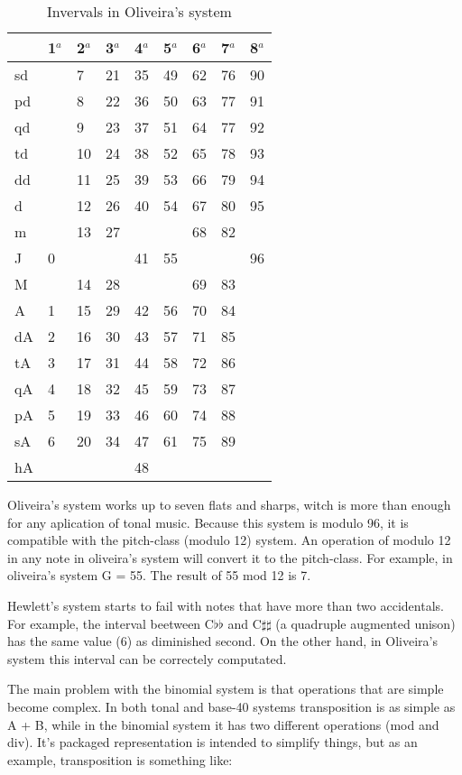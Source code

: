 \documentclass{article}
\begin{document}
\begin{table}
  \centering
  \begin{tabular}{l|llllllll}
    & 1$^{a}$& 2$^{a}$& 3$^{a}$& 4$^{a}$& 5$^{a}$& 6$^{a}$& 7$^{a}$& 8$^{a}$ \\
    \hline
    sd  &  & 7&21&35&49&62&76&90 \\
    pd  &  & 8&22&36&50&63&77&91 \\
    qd  &  & 9&23&37&51&64&77&92 \\
    td  &  &10&24&38&52&65&78&93 \\
    dd  &  &11&25&39&53&66&79&94 \\
    d   &  &12&26&40&54&67&80&95 \\
    m   &  &13&27&  &  &68&82&   \\
    J   & 0&  &  &41&55&  &  &96 \\
    M   &  &14&28&  &  &69&83&   \\
    A   & 1&15&29&42&56&70&84&   \\
    dA  & 2&16&30&43&57&71&85&   \\
    tA  & 3&17&31&44&58&72&86&   \\
    qA  & 4&18&32&45&59&73&87&   \\
    pA  & 5&19&33&46&60&74&88&   \\
    sA  & 6&20&34&47&61&75&89&   \\
    hA  &  &  &  &48&  &  &  &   
  \end{tabular}
  \caption{Invervals in Oliveira's system}
  \label{tab:jama-intervalos}
\end{table}

Oliveira's system works up to seven flats and sharps, witch is more
than enough for any aplication of tonal music. Because this system is
modulo 96, it is compatible with the pitch-class (modulo 12) system.
An operation of modulo 12 in any note in oliveira's system will
convert it to the pitch-class. For example, in oliveira's system G =
55. The result of 55 mod 12 is 7.

Hewlett's system starts to fail with notes that have more than two
accidentals. For example, the interval beetween C$\flat\flat$ and
C$\sharp\sharp$ (a quadruple augmented unison) has the same value (6)
as diminished second. On the other hand, in Oliveira's system this
interval can be correctely computated.

The main problem with the binomial system is that operations that are
simple become complex. In both tonal and base-40 systems transposition
is as simple as A + B, while in the binomial system it has two
different operations (mod and div). It's packaged representation is
intended to simplify things, but as an example, transposition is
something like:
\end{document}
